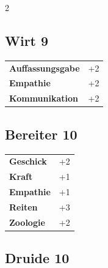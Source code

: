 \begin{multicols}{2}
\begin{tcolorbox}
\end{tcolorbox}

\begin{tcolorbox}
    \subsection*{Wirt \hfill \small{9 }}
    \tcblower




\begin{tabular}{@{}ll@{}}
    \textbf{Auffassungsgabe} & +2\\
    \textbf{Empathie} & +2\\
    \textbf{Kommunikation} & +2\\
\end{tabular}


\end{tcolorbox}

\begin{tcolorbox}
    \subsection*{Bereiter \hfill \small{10 }}
    \tcblower




\begin{tabular}{@{}ll@{}}
    \textbf{Geschick} & +2\\
    \textbf{Kraft} & +1\\
    \textbf{Empathie} & +1\\
    \textbf{Reiten} & +3\\
    \textbf{Zoologie} & +2\\
\end{tabular}


\end{tcolorbox}

\begin{tcolorbox}
    \subsection*{Druide \hfill \small{10 }}
    \tcblower



\end{tcolorbox}
\end{multicols}
